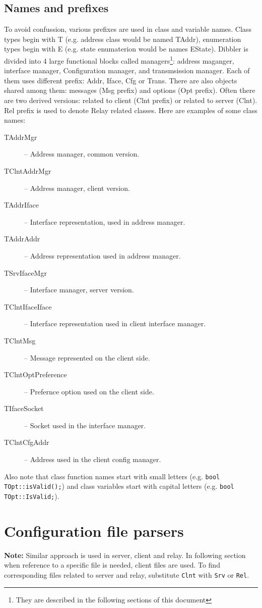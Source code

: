 \subsection{Names and prefixes}
To avoid confussion, various prefixes are used in class and variable
names. Class types begin with T (e.g. address class would be named
TAddr), enumeration types begin with E (e.g. state enumaterion would
be names EState). Dibbler is divided into 4 large functional blocks
called managers\footnote{They are described in the following sections
  of this document}: address maganger, interface manager, Configuration
manager, and transmsission manager. Each of them uses different
prefix: Addr, Iface, Cfg or Trans. There are also objects shared among
them: messages (Msg prefix) and options (Opt prefix). Often there are
two derived versions: related to client (Clnt prefix) or related to
server (Clnt). Rel prefix is used to denote Relay related classes. 
Here are examples of some class names:
\begin{description}
\item[TAddrMgr] -- Address manager, common version.
\item[TClntAddrMgr] -- Address manager, client version.
\item[TAddrIface] -- Interface representation, used in address manager.
\item[TAddrAddr] -- Address representation used in address manager.
\item[TSrvIfaceMgr] -- Interface manager, server version.
\item[TClntIfaceIface] -- Interface representation used in client
  interface manager.
\item[TClntMsg] -- Message represented on the client side.
\item[TClntOptPreference] -- Prefernce option used on the client side.
\item[TIfaceSocket] -- Socket used in the interface manager.
\item[TClntCfgAddr] -- Address used in the client config manager.
\end{description}

Also note that class function names start with small letters
(e.g. \verb+bool TOpt::isValid();+) and class variables start with capital
letters (e.g. \verb+bool TOpt::IsValid;+).

\section{Configuration file parsers}
\textbf{Note:} Similar approach is used in server, client and
relay. In following section when reference to a specific file is needed,
client files are used. To find corresponding files related to server and
relay, substitute \verb+Clnt+ with \verb+Srv+ or \verb+Rel+.

